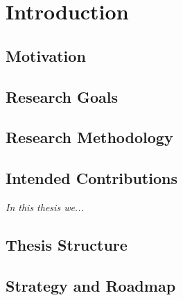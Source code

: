 \chapter{Introduction}
\graphicspath{{mainmatter/introduction/figures/}}





\section{Motivation}



\section{Research Goals}

\section{Research Methodology}

\section{Intended Contributions}

\textit{In this thesis we...}


\section{Thesis Structure}

\section{Strategy and Roadmap}